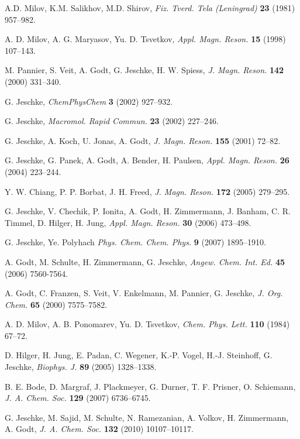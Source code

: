 \documentclass[11pt,a4paper]{article}
\begin{document}
\begin{thebibliography}{00}




A.D. Milov, K.M. Salikhov, M.D. Shirov, 
{\em Fiz. Tverd. Tela (Leningrad)} {\bf 23} (1981) 957--982.

A. D. Milov, A. G. Maryasov, Yu. D. Tsvetkov, 
{\em Appl. Magn. Reson.} {\bf 15} (1998) 107--143.

M. Pannier, S. Veit, A. Godt, G. Jeschke, H. W. Spiess,
{\em J. Magn. Reson.} {\bf 142} (2000) 331--340.

G. Jeschke,
{\em ChemPhysChem} {\bf 3} (2002) 927--932.

G. Jeschke,
{\em Macromol. Rapid Commun.} {\bf 23} (2002) 227--246.

G. Jeschke, A. Koch, U. Jonas, A. Godt,
{\em J. Magn. Reson.} {\bf 155} (2001) 72--82.

G. Jeschke, G. Panek, A. Godt, A. Bender, H. Paulsen,
{\em Appl. Magn. Reson.} {\bf 26} (2004) 223--244.

Y. W. Chiang, P. P. Borbat, J. H. Freed,
{\em J. Magn. Reson.} {\bf 172} (2005) 279--295.

G. Jeschke, V. Chechik, P. Ionita, A. Godt, H. Zimmermann, J. Banham, C. R. Timmel, D. Hilger, H. Jung,
{\em Appl. Magn. Reson.} {\bf 30} (2006) 473--498.

G. Jeschke, Ye. Polyhach
{\em Phys. Chem. Chem. Phys.} {\bf 9} (2007) 1895--1910.

A. Godt, M. Schulte, H. Zimmermann, G. Jeschke,
{\em Angew. Chem. Int. Ed.} {\bf 45} (2006) 7560-7564.

A. Godt, C. Franzen, S. Veit, V. Enkelmann, M. Pannier, G. Jeschke,
{\em J. Org. Chem.} {\bf 65} (2000) 7575--7582.

A. D. Milov, A. B. Ponomarev, Yu. D. Tsvetkov,
{\em Chem. Phys. Lett.} {\bf 110} (1984) 67--72.

D. Hilger, H. Jung, E. Padan, C. Wegener, K.-P. Vogel, H.-J. Steinhoff, G. Jeschke, 
{\em Biophys. J.} {\bf 89} (2005) 1328--1338.

B. E. Bode, D. Margraf, J. Plackmeyer, G. Durner, T. F. Prisner, O. Schiemann, 
{\em J. A. Chem. Soc.} {\bf 129} (2007) 6736--6745.

G. Jeschke, M. Sajid, M. Schulte, N. Ramezanian, A. Volkov, H. Zimmermann,  A. Godt, 
{\em J. A. Chem. Soc.} {\bf 132} (2010) 10107--10117.

\end{thebibliography}
\end{document}
